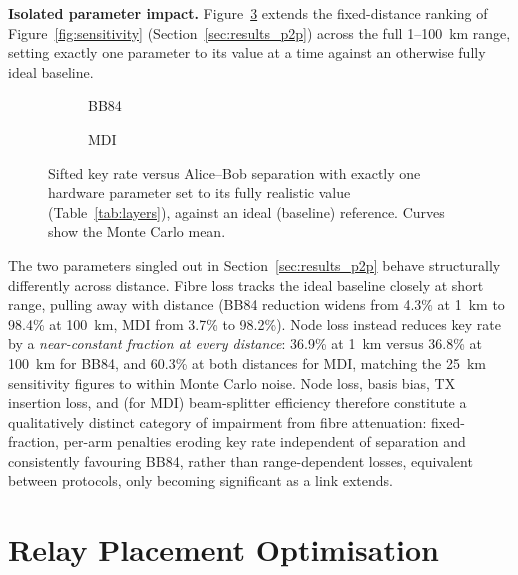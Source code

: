 \documentclass[12pt]{article}
\let\oldsection\section
\renewcommand{\section}{\clearpage\oldsection}
\begin{document}
\textbf{Isolated parameter impact.} Figure~\ref{fig:isolate} extends the fixed-distance ranking of Figure~\ref{fig:sensitivity} (Section~\ref{sec:results_p2p}) across the full 1--100~km range, setting exactly one parameter to its value at a time against an otherwise fully ideal baseline.

\begin{figure}[hbtp]
    \centering
    \begin{subfigure}[t]{219pt}
        \centering
        
        \caption{BB84}
        \label{fig:isolate_bb84}
    \end{subfigure}%
    \begin{subfigure}[t]{244pt}
        \centering
        
        \caption{MDI}
        \label{fig:isolate_mdi}
    \end{subfigure}
    \caption{Sifted key rate versus Alice--Bob separation with exactly one hardware parameter set to its fully realistic value (Table~\ref{tab:layers}), against an ideal (baseline) reference. Curves show the Monte Carlo mean.}
    \label{fig:isolate}
\end{figure}

The two parameters singled out in Section~\ref{sec:results_p2p} behave structurally differently across distance. Fibre loss tracks the ideal baseline closely at short range, pulling away with distance (BB84 reduction widens from 4.3\% at 1~km to 98.4\% at 100~km, MDI from 3.7\% to 98.2\%). Node loss instead reduces key rate by a \emph{near-constant fraction at every distance}: 36.9\% at 1~km versus 36.8\% at 100~km for BB84, and 60.3\% at both distances for MDI, matching the 25~km sensitivity figures to within Monte Carlo noise. Node loss, basis bias, TX insertion loss, and (for MDI) beam-splitter efficiency therefore constitute a qualitatively distinct category of impairment from fibre attenuation: fixed-fraction, per-arm penalties eroding key rate independent of separation and consistently favouring BB84, rather than range-dependent losses, equivalent between protocols, only becoming significant as a link extends.

\section{Relay Placement Optimisation}
\label{sec:appendix_relay}
\end{document}
